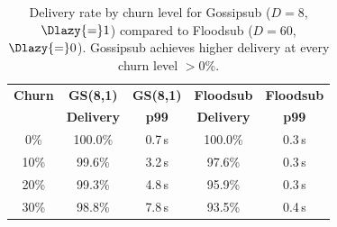 \begin{table}[t]
      \centering
      \small
      \renewcommand{\arraystretch}{0.85}
      \caption{Delivery rate by churn level for Gossipsub ($D{=}8$, $\Dlazy{=}1$)
            compared to Floodsub ($D{=}60$, $\Dlazy{=}0$). Gossipsub achieves
            higher delivery at every churn level $>$0\%.}
      \label{tab:churn-sensitivity}
      \begin{tabular}{ccccc}
            \toprule
            \textbf{Churn} & \textbf{GS(8,1)}  & \textbf{GS(8,1)} & \textbf{Floodsub} & \textbf{Floodsub} \\
                           & \textbf{Delivery} & \textbf{p99}     & \textbf{Delivery} & \textbf{p99}      \\
            \midrule
            0\%            & 100.0\%           & 0.7\,s           & 100.0\%           & 0.3\,s            \\
            10\%           & 99.6\%            & 3.2\,s           & 97.6\%            & 0.3\,s            \\
            20\%           & 99.3\%            & 4.8\,s           & 95.9\%            & 0.3\,s            \\
            30\%           & 98.8\%            & 7.8\,s           & 93.5\%            & 0.4\,s            \\
            \bottomrule
      \end{tabular}
\end{table}
